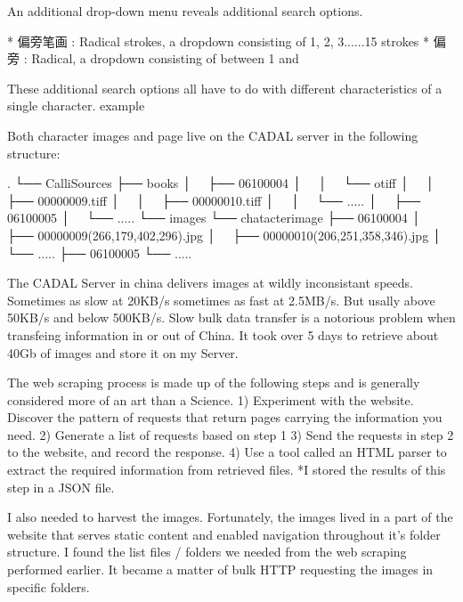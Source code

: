             An additional drop-down menu reveals additional search options.
            
            * 偏旁笔画 : Radical strokes, a dropdown consisting of 1, 2, 3......15 strokes
            *  偏旁 : Radical, a dropdown consisting of between 1 and 
            
            
            These additional search options all have to do with different characteristics of a single character.  example


    Both character images and page live on the CADAL server in the following structure:


.
└── CalliSources
    ├── books
    │   ├── 06100004
    │   │   └── otiff
    │   │       ├── 00000009.tiff
    │   │       ├── 00000010.tiff
    │   │       └── .....
    │   ├── 06100005
    │   └── .....
    └── images
        └── chatacterimage
            ├── 06100004
            │   ├── 00000009(266,179,402,296).jpg
            │   ├── 00000010(206,251,358,346).jpg
            │   └── .....
            ├── 06100005
            └── .....


The CADAL Server in china delivers images at wildly inconsistant speeds.  Sometimes as slow at 20KB/s sometimes as fast at 2.5MB/s.  But usally above 50KB/s and below 500KB/s.  Slow bulk data transfer is a notorious problem when transfeing information in or out of China.  It took over 5 days to retrieve about 40Gb of images and store it on my Server.

            
            
            
            The web scraping process is made up of the following steps and is generally considered more of an art than a Science.
                1)  Experiment with the website.  Discover the pattern of requests that return pages carrying the information you need.
                2)  Generate a list of requests based on step 1
                3)  Send the requests in step 2 to the website, and record the response.
                4)  Use a tool called an HTML parser to extract the required information from retrieved files.
                    *I stored the results of this step in a JSON file.
                
            I also needed to harvest the images.  Fortunately, the images lived in a part of the website that serves static content and enabled navigation throughout it's folder structure.  I found the list files / folders we needed from the web scraping performed earlier.  It became a matter of bulk HTTP requesting the images in specific folders.
            
